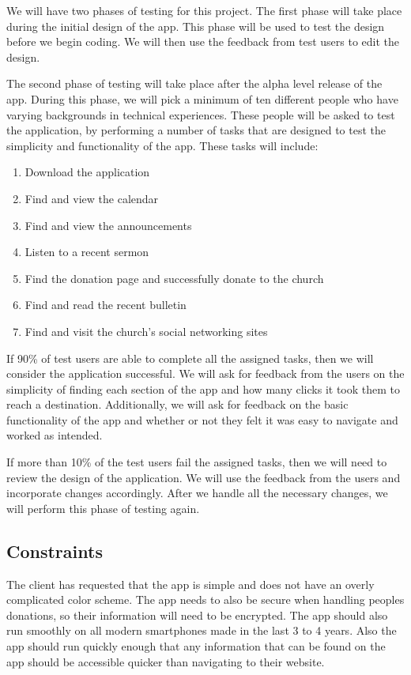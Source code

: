 \documentclass[letterpaper,10pt,draftclsnofoot,onecolumn,compsoc,titlepage]{IEEEtran}
\begin{document}
	We will have two phases of testing for this project.
	The first phase will take place during the initial design of the app.
	This phase will be used to test the design before we begin coding.
	We will then use the feedback from test users to edit the design.

	The second phase of testing will take place after the alpha level release of the app.
	During this phase, we will pick a minimum of ten different people who have varying backgrounds in technical experiences.
	These people will be asked to test the application, by performing a number of tasks that are designed to test the simplicity and functionality of the app.
	These tasks will include:
	\begin{enumerate}
		\item{Download the application}
		\item{Find and view the calendar}
		\item{Find and view the announcements}
		\item{Listen to a recent sermon}
		\item{Find the donation page and successfully donate to the church}
		\item{Find and read the recent bulletin}
		\item{Find and visit the church's social networking sites}
	\end{enumerate}
	If 90\% of test users are able to complete all the assigned tasks, then we will consider the application successful.
	We will ask for feedback from the users on the simplicity of finding each section of the app and how many clicks it took them to reach a destination.
	Additionally, we will ask for feedback on the basic functionality of the app and whether or not they felt it was easy to navigate and worked as intended.

	If more than 10\% of the test users fail the assigned tasks, then we will need to review the design of the application.
	We will use the feedback from the users and incorporate changes accordingly.
	After we handle all the necessary changes, we will perform this phase of testing again.

	\subsection{Constraints}
	The client has requested that the app is simple and does not have an overly complicated color scheme.
	The app needs to also be secure when handling peoples donations, so their information will need to be encrypted.
	The app should also run smoothly on all modern smartphones made in the last 3 to 4 years.
	Also the app should run quickly enough that any information that can be found on the app should be accessible quicker than navigating to their website.
\end{document}
